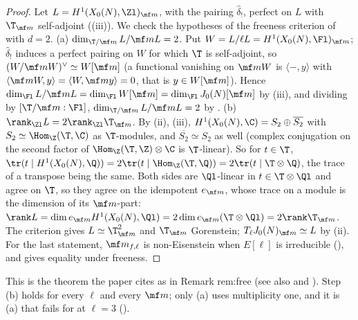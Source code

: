 \begin{proof}
Let $L=H^1(X_0(N),\Zl)_{\mf m}$, with the pairing $\hat\delta_!$, perfect on $L$ with $\T_{\mf m}$ self-adjoint ((iii)). We check the hypotheses of the freeness criterion of
 with $d=2$.
(a) $\dim_{\T/\mf m}L/\mf mL=2$. Put $W=L/\ell L=H^1(X_0(N),\Fl)_{\mf m}$; $\hat\delta_!$ induces a perfect pairing on $W$ for which $\T$ is self-adjoint, so $(W/\mf mW)^\vee\simeq W[\mf m]$ (a functional
vanishing on $\mf mW$ is $\langle-,y\rangle$ with $\langle\mf mW,y\rangle=\langle W,\mf my\rangle=0$, that is $y\in W[\mf m]$). Hence $\dim_{\Fl}L/\mf mL=\dim_{\Fl}W[\mf m]=\dim_{\Fl}J_0(N)[\mf m]$ by
(iii), and dividing by $[\T/\mf m:\Fl]$, $\dim_{\T/\mf m}L/\mf mL=2$ by .
(b) $\rank_{\Zl}L=2\rank_{\Zl}\T_{\mf m}$. By (ii), (iii), $H^1(X_0(N),\C)=S_2\oplus\overline{S_2}$ with $S_2\simeq\Hom_\Z(\T,\C)$ as $\T$-modules, and
$\overline{S_2}\simeq S_2$ as well (complex conjugation on the second factor of $\Hom_\Z(\T,\Z)\otimes\C$ is $\T$-linear). So for $t\in\T$,
$\tr(t\mid H^1(X_0(N),\Q))=2\tr(t\mid\Hom_\Z(\T,\Q))=2\tr(t\mid\T\otimes\Q)$, the trace of a transpose being the same. Both sides are $\Ql$-linear in $t\in\T\otimes\Ql$ and agree on $\T$, so they agree on
the idempotent $e_{\mf m}$, whose trace on a module is the dimension of its $\mf m$-part: $\rank L=\dim e_{\mf m}H^1(X_0(N),\Ql)=2\dim e_{\mf m}(\T\otimes\Ql)=2\rank\T_{\mf m}$.
The criterion gives $L\simeq\T_{\mf m}^2$ and $\T_{\mf m}$ Gorenstein; $T_\ell J_0(N)_{\mf m}\simeq L$ by (ii). For the last statement, $\mf m_{f,\ell}$ is non-Eisenstein when
$E[\ell]$ is irreducible (), and  gives equality under freeness.
\end{proof}

This is the theorem the paper cites as \cite{Tilouine97} in Remark rem:free (see also \cite[Chapter 2]{Wiles95} and \cite[Section 4]{DDT}). Step (b) holds for every $\ell$ and every $\mf m$; only (a) uses
multiplicity one, and it is (a) that fails for  at $\ell=3$ ().

